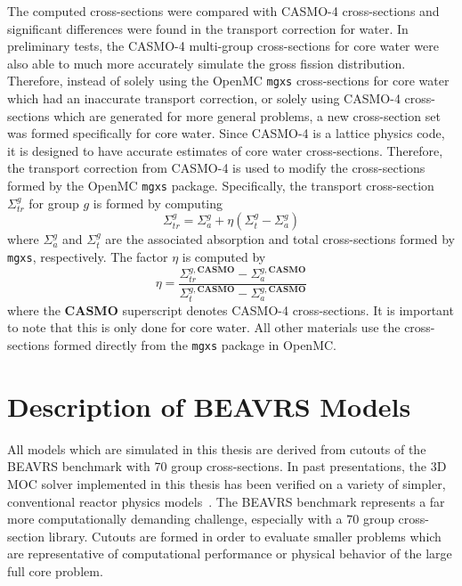 \clearpage

The computed cross-sections were compared with CASMO-4 cross-sections and significant differences were found in the transport correction for water. In preliminary tests, the CASMO-4 multi-group cross-sections for core water were also able to much more accurately simulate the gross fission distribution. Therefore, instead of solely using the OpenMC \texttt{mgxs} cross-sections for core water which had an inaccurate transport correction, or solely using CASMO-4 cross-sections which are generated for more general problems, a new cross-section set was formed specifically for core water. Since CASMO-4 is a lattice physics code, it is designed to have accurate estimates of core water cross-sections. Therefore, the transport correction from CASMO-4 is used to modify the cross-sections formed by the OpenMC \texttt{mgxs} package. Specifically, the transport cross-section $\Sigma_{tr}^g$ for group $g$ is formed by computing
\begin{equation}
\Sigma_{tr}^g = \Sigma_{a}^g + \eta \left( \Sigma_{t}^g - \Sigma_{a}^g \right)
\end{equation}
where $\Sigma_{a}^g$ and $\Sigma_{t}^g$ are the associated absorption and total cross-sections formed by \texttt{mgxs}, respectively. The factor $\eta$ is computed by
\begin{equation}
\eta = \frac{\Sigma_{tr}^{g, \textbf{CASMO}} - \Sigma_{a}^{g, \textbf{CASMO}}}{\Sigma_{t}^{g, \textbf{CASMO}} - \Sigma_{a}^{g, \textbf{CASMO}}}
\end{equation}
where the \textbf{CASMO} superscript denotes CASMO-4 cross-sections. It is important to note that this is only done for core water. All other materials use the cross-sections formed directly from the \texttt{mgxs} package in OpenMC.

\section{Description of BEAVRS Models}
\label{sec:beavrs-models}

All models which are simulated in this thesis are derived from cutouts of the BEAVRS benchmark with 70 group cross-sections. In past presentations, the 3D \ac{MOC} solver implemented in this thesis has been verified on a variety of simpler, conventional reactor physics models~\cite{physor2016shaner, physor2016otf}. The BEAVRS benchmark represents a far more computationally demanding challenge, especially with a 70 group cross-section library. Cutouts are formed in order to evaluate smaller problems which are representative of computational performance or physical behavior of the large full core problem.

